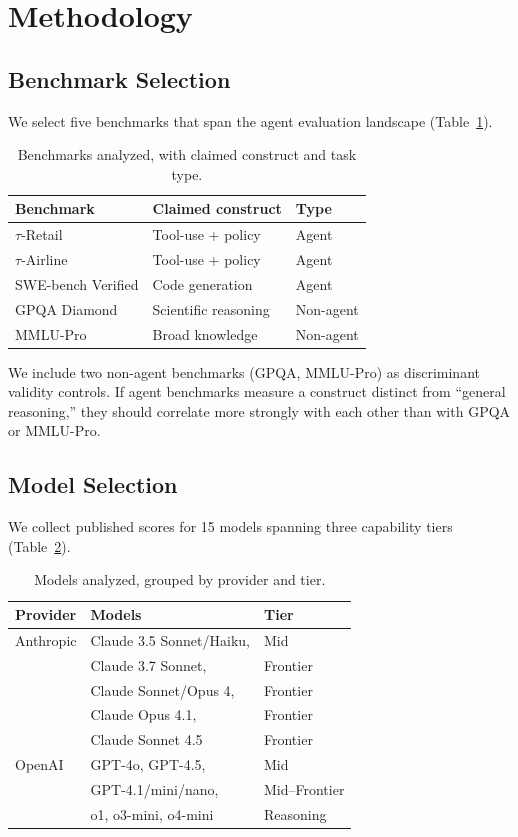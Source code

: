 \documentclass[11pt]{article}
\begin{document}
\section{Methodology}\label{sec:method}
\subsection{Benchmark Selection}
We select five benchmarks that span the agent evaluation landscape (Table~\ref{tab:benchmarks}).

\begin{table}[h]
\caption{Benchmarks analyzed, with claimed construct and task type.}
\label{tab:benchmarks}
\begin{tabular}{lll}
\toprule
Benchmark & Claimed construct & Type \\
\midrule
$\tau$-Retail & Tool-use + policy & Agent \\
$\tau$-Airline & Tool-use + policy & Agent \\
SWE-bench Verified & Code generation & Agent \\
GPQA Diamond & Scientific reasoning & Non-agent \\
MMLU-Pro & Broad knowledge & Non-agent \\
\bottomrule
\end{tabular}
\end{table}

We include two non-agent benchmarks (GPQA, MMLU-Pro) as discriminant validity controls. If agent benchmarks measure a construct distinct from ``general reasoning,'' they should correlate more strongly with each other than with GPQA or MMLU-Pro.

\subsection{Model Selection}
We collect published scores for 15 models spanning three capability tiers (Table~\ref{tab:models}).

\begin{table}[h]
\caption{Models analyzed, grouped by provider and tier.}
\label{tab:models}
\begin{tabular}{lll}
\toprule
Provider & Models & Tier \\
\midrule
Anthropic & Claude 3.5 Sonnet/Haiku, & Mid \\
 & Claude 3.7 Sonnet, & Frontier \\
 & Claude Sonnet/Opus 4, & Frontier \\
 & Claude Opus 4.1, & Frontier \\
 & Claude Sonnet 4.5 & Frontier \\
OpenAI & GPT-4o, GPT-4.5, & Mid \\
 & GPT-4.1/mini/nano, & Mid--Frontier \\
 & o1, o3-mini, o4-mini & Reasoning \\
\bottomrule
\end{tabular}
\end{table}
\end{document}
